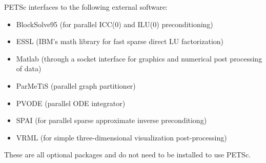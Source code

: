 \vspace{.3in}
\noindent
PETSc interfaces to the following external software:
\begin{itemize}
  \item BlockSolve95 (for parallel ICC(0) and ILU(0) preconditioning)
  \item ESSL         (IBM's math library for fast sparse direct LU factorization)
  \item Matlab       (through a socket interface for graphics and numerical post processing 
                      of data)
  \item ParMeTiS      (parallel graph partitioner)
  \item PVODE        (parallel ODE integrator)
  \item SPAI         (for parallel sparse approximate inverse preconditiong)
  \item VRML         (for simple three-dimensional visualization post-processing)
\end{itemize}
These are all optional packages and do not need to be installed to use PETSc.


